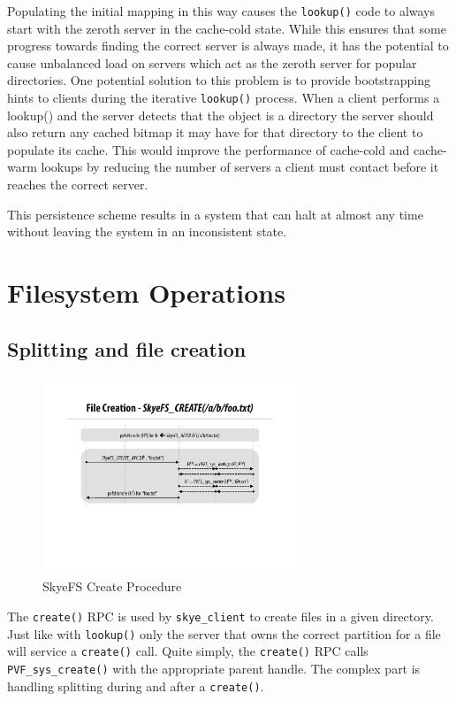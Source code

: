 \documentclass[twocolumn,letterpaper]{article}
\newcommand{\code}[1]{\texttt{#1}}
\begin{document}
Populating the initial mapping in this way causes the \code{lookup()} code to always
start with the zeroth server in the cache-cold state.  While this ensures that
some progress towards finding the correct server is always made, it has the
potential to cause unbalanced load on servers which act as the zeroth server for
popular directories.  One potential solution to this problem is to provide
bootstrapping hints to clients during the iterative \code{lookup()} process.
When a client performs a {lookup()} and the server detects that the object is
a directory the server should also return any cached bitmap it may have for
that directory to the client to populate its cache.  This would improve the
performance of cache-cold and cache-warm lookups by reducing the number of
servers a client must contact before it reaches the correct server. 

This persistence scheme results in a system that can halt at almost any time
without leaving the system in an inconsistent state.

\section{Filesystem Operations}
\subsection{Splitting and file creation}
\begin{figure}
\begin{center}
\includegraphics[width=3in]{figure-create}
\end{center}
\caption{SkyeFS Create Procedure}
\end{figure}
The \code{create()} RPC is used by \code{skye\_\-client} to create files in a given
directory.  Just like with \code{lookup()} only the server that owns the correct
partition for a file will service a \code{create()} call.  Quite simply, the
\code{create()} RPC calls \code{PVF\_\-sys\_\-create()} with the appropriate
parent handle.  The complex part is handling splitting during and after a
\code{create()}.
\end{document}
